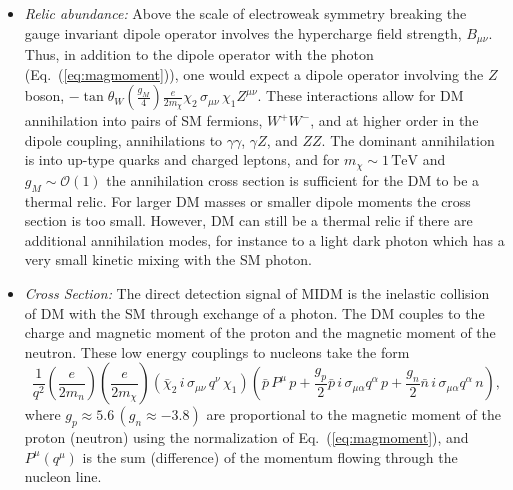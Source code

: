 \documentclass[11pt]{article}
\begin{document}
\begin{itemize}
\item {\it Relic abundance:} Above the scale of electroweak symmetry breaking the gauge invariant dipole operator involves the hypercharge field strength, $B_{\mu\nu}$.  Thus, in addition to the dipole operator with the photon (Eq.~(\ref{eq:magmoment})), one would expect a dipole operator involving the $Z$ boson, $-\tan\theta_W \left( \frac {g_M}{4} \right) \frac{e}{2 m_{\chi}} \chi_2\, \sigma_{\mu\nu}\, \chi_1 Z^{\mu\nu} $.  These interactions allow for DM annihilation into pairs of SM fermions, $W^+W^-$, and at higher order in the dipole coupling, annihilations to $\gamma\gamma$, $\gamma Z$, and $ZZ$.  The dominant annihilation is into up-type quarks and charged leptons, and for $m_\chi\sim 1\,\mathrm{TeV}$ and $g_M\sim \mathcal{O}(1)$ the annihilation cross section is sufficient for the DM to be a thermal relic.  For larger DM masses or smaller dipole moments the cross section is too small.  However, DM can still be a thermal relic if there are additional annihilation modes, for instance to a light dark photon which has a very small kinetic mixing with the SM photon.

\item {\it Cross Section:} The direct detection signal of MIDM is the inelastic collision of DM with the SM through exchange of a photon.  The DM couples to the charge and magnetic moment of the proton and the magnetic moment of the neutron.   These low energy couplings to nucleons take the form
\begin{equation}
\; \frac{1}{q^2}\left(\frac{e}{2m_n}\right)\left(\frac{e}{2m_\chi}\right) (\bar{\chi}_2\, i\, \sigma_{\mu\nu}\,q^{\nu}\, \chi_1)\left(\bar{p}\, P^{\mu}\, p + \frac{g_p}{2} \bar{p}\, i\, \sigma_{\mu\alpha}q^{\alpha}\, p +  \frac{g_n}{2} \bar{n}\, i\, \sigma_{\mu\alpha}q^{\alpha}\, n\right),
\end{equation}
where $g_p\approx 5.6\, (g_n\approx -3.8)$ are proportional to the magnetic moment of the proton (neutron) using the normalization of Eq.~(\ref{eq:magmoment}), and $P^{\mu} (q^\mu)$ is the sum (difference) of the momentum flowing through the nucleon line.  


\end{itemize}
\end{document}
